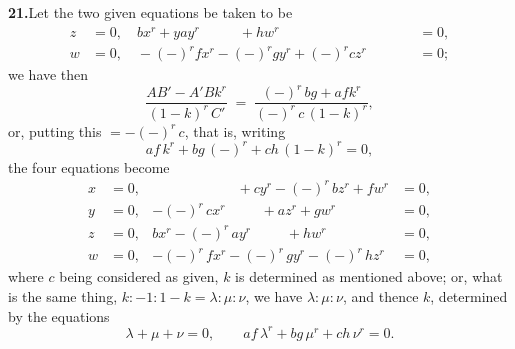 \documentclass[11pt,a4paper]{article}
\begin{document}
\textbf{21.}\quad Let the two given equations be taken to be
\begin{align*}
z &= 0, \quad b x^{r} + y a y^{r} \phantom{{} + c'z^{r}} + h w^{r} &= 0, \\
w &= 0, \quad -(-)^{r} f x^{r} - (-)^{r} g y^{r} + (-)^{r} c z^{r}
              \phantom{{} + h w^{r}} &= 0;
\end{align*}
we have then
\[
\frac{AB' - A'B k^{r}}{(1 - k)^{r}\,C'}
   \;=\; \frac{(-)^{r}\,bg + af k^{r}}{(-)^{r}\,c\,(1 - k)^{r}},
\]
or, putting this $= -(-)^{r}\,c$, that is, writing
\[
af\,k^{r} + bg\,(-)^{r} + ch\,(1 - k)^{r} = 0,
\]
the four equations become
\begin{align*}
x &= 0, & \phantom{ {}-(-)^{r}ca x^{r}} + c y^{r} - (-)^{r}\,b z^{r} + f w^{r} &= 0, \\
y &= 0, & -(-)^{r}\,c x^{r} \phantom{{} + cy^{r}} + a z^{r} + g w^{r} &= 0, \\
z &= 0, & b x^{r} - (-)^{r}\,a y^{r} \phantom{{} + cz^{r}} + h w^{r} &= 0, \\
w &= 0, & -(-)^{r}\,f x^{r} - (-)^{r}\,g y^{r} - (-)^{r}\,h z^{r} &= 0,
\end{align*}
where $c$ being considered as given, $k$ is determined as mentioned above; or,
what is the same thing, $k : -1 : 1 - k = \lambda : \mu : \nu$, we have
$\lambda : \mu : \nu$, and thence $k$, determined by the equations
\[
\lambda + \mu + \nu = 0, \qquad af\,\lambda^{r} + bg\,\mu^{r} + ch\,\nu^{r} = 0.
\]
\end{document}
